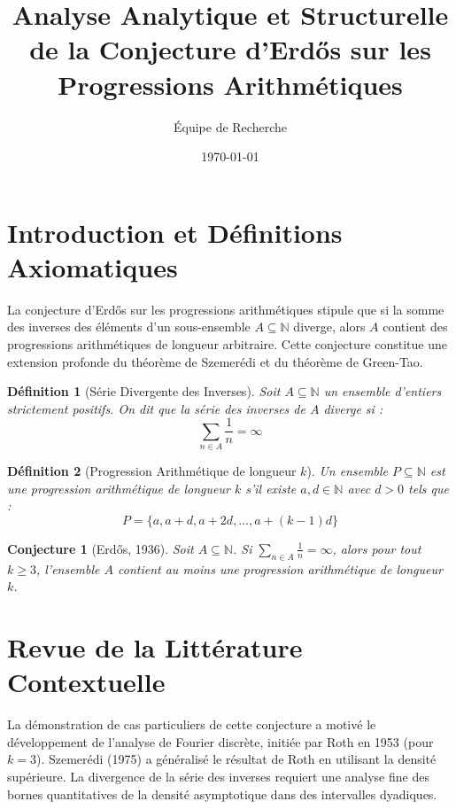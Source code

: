 \documentclass[11pt,a4paper]{article}
\title{Analyse Analytique et Structurelle de la Conjecture d'Erd\H{o}s sur les Progressions Arithmétiques}
\author{Équipe de Recherche}
\date{\today}
\newtheorem{definition}{Définition}
\newtheorem{conjecture}{Conjecture}
\begin{document}
\maketitle
\tableofcontents
\newpage

\section{Introduction et Définitions Axiomatiques}

La conjecture d'Erd\H{o}s sur les progressions arithmétiques stipule que si la somme des inverses des éléments d'un sous-ensemble $A \subseteq \mathbb{N}$ diverge, alors $A$ contient des progressions arithmétiques de longueur arbitraire. Cette conjecture constitue une extension profonde du théorème de Szemerédi et du théorème de Green-Tao.

\begin{definition}[Série Divergente des Inverses]
Soit $A \subseteq \mathbb{N}$ un ensemble d'entiers strictement positifs. On dit que la série des inverses de $A$ diverge si :
$$ \sum_{n \in A} \frac{1}{n} = \infty $$
\end{definition}

\begin{definition}[Progression Arithmétique de longueur $k$]
Un ensemble $P \subseteq \mathbb{N}$ est une progression arithmétique de longueur $k$ s'il existe $a, d \in \mathbb{N}$ avec $d > 0$ tels que :
$$ P = \{ a, a+d, a+2d, \dots, a+(k-1)d \} $$
\end{definition}

\begin{conjecture}[Erd\H{o}s, 1936]
Soit $A \subseteq \mathbb{N}$. Si $\sum_{n \in A} \frac{1}{n} = \infty$, alors pour tout $k \geq 3$, l'ensemble $A$ contient au moins une progression arithmétique de longueur $k$.
\end{conjecture}

\section{Revue de la Littérature Contextuelle}

La démonstration de cas particuliers de cette conjecture a motivé le développement de l'analyse de Fourier discrète, initiée par Roth en 1953 (pour $k=3$). Szemerédi (1975) a généralisé le résultat de Roth en utilisant la densité supérieure. La divergence de la série des inverses requiert une analyse fine des bornes quantitatives de la densité asymptotique dans des intervalles dyadiques.
\end{document}
